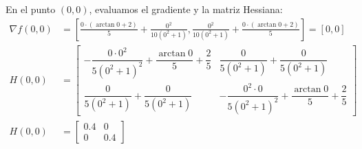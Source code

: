 \documentclass[11pt, a4paper, twocolumn]{beamer}
\begin{document}
 En el punto $(0,0)$, evaluamos el gradiente y la matriz Hessiana:
 { \footnotesize
 \begin{align*}
 	\nabla f(0,0) &= \left[\frac{0 \cdot (\arctan 0 + 2)}{5} + \frac{0^2}{10(0^2 + 1)}, \frac{0^2}{10(0^2 + 1)} + \frac{0 \cdot (\arctan 0 + 2)}{5}\right] = [0, 0] \\
 	H(0,0) &= \begin{bmatrix}
 		-\dfrac{0 \cdot 0^2}{5(0^2 + 1)^2} + \dfrac{\arctan 0}{5} + \dfrac{2}{5} & \dfrac{0}{5(0^2 + 1)} + \dfrac{0}{5(0^2 + 1)} \\[1em]
 		\dfrac{0}{5(0^2 + 1)} + \dfrac{0}{5(0^2 + 1)} & -\dfrac{0^2 \cdot 0}{5(0^2 + 1)^2} + \dfrac{\arctan 0}{5} + \dfrac{2}{5} 
 	\end{bmatrix} \\
 	H(0,0) &= \begin{bmatrix}
 		0.4 & 0 \\
 		0 & 0.4
 	\end{bmatrix}
 \end{align*}
}
\newpage
\end{document}
